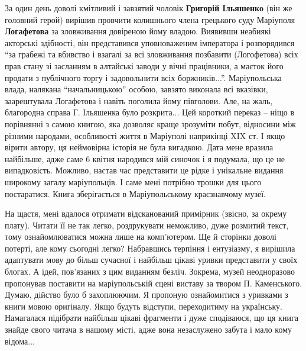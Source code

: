 За один день доволі кмітливий і завзятий чоловік \textbf{Григорій Ільяшенко} (він же
головний герой) вирішив провчити колишнього члена грецького суду Маріуполя
\textbf{Логафетова} за зловживання довіреною йому владою. Виявивши неабиякі акторські
здібності, він представився уповноваженим імператора і розпорядився \enquote{за грабежі
та вбивство і взагалі за всі зловживання позбавити (Логофетова) всіх прав стану
зі засланням в алтайські заводи у вічні працівники, а маєток його продати з
публічного торгу і задовольнити всіх боржників...}. Маріупольська влада,
налякана \enquote{начальницькою} особою, завзято виконала всі вказівки, заарештувала
Логафетова і навіть поголила йому півголови. Але, на жаль, благородна справа Г.
Ільяшенка було розкрита... Цей короткий переказ – ніщо в порівнянні з самою
книгою, яка дозволяє краще зрозуміти побут, відносини між різними народами,
особливості життя в Маріуполі наприкінці XIX ст. І якщо вірити автору, ця
неймовірна історія не була вигадкою. Дата мене вразила найбільше, адже саме 6
квітня народився мій синочок і я подумала, що це не випадковість. Можливо,
настав час представити це рідке і унікальне видання широкому загалу
маріупольців. І саме мені потрібно трошки для цього постаратися. Книга
зберігається в Маріупольському краєзнавчому музеї.

На щастя, мені вдалося отримати відсканований примірник (звісно, за окрему
плату). Читати її не так легко, роздрукувати неможливо, дуже розмитий текст,
тому ознайомлюватися можна лише на комп'ютером. Ще й сторінки доволі потерті,
але кому сьогодні легко? Набравшись терпіння і ентузіазму, я вирішила
адаптувати мову до більш сучасної і найбільш цікаві уривки представити у своїх
блогах. А ідей, пов'язаних з цим виданням безліч. Зокрема, музей неодноразово
пропонував поставити на маріупольській сцені виставу за твором П. Каменського.
Думаю, дійство було б захоплюючим. Я пропоную ознайомитися з уривками з книги
мовою оригіналу. Якщо будуть відступи, переходитиму на українську. Намагалася
підібрати найбільш цікаві фрагменти і дуже сподіваюся, що ця книга знайде свого
читача в нашому місті, адже вона незаслужено забута і мало кому відома...


